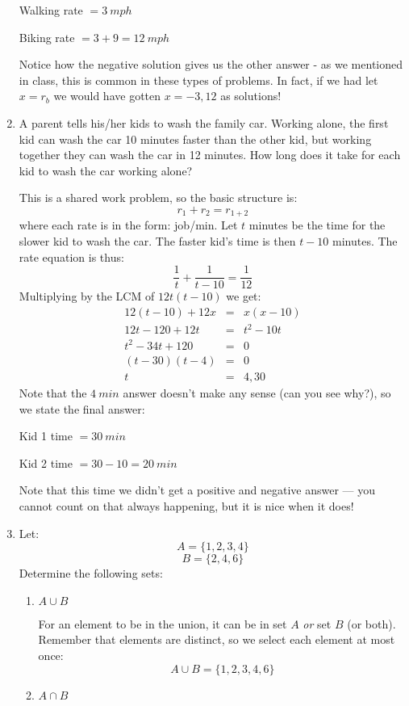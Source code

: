 \documentclass[letterpaper,12pt,fleqn]{article}
\begin{document}
\begin{enumerate}
  Walking rate $=\SI{3}{mph}$

  Biking rate $=3+9=\SI{12}{mph}$

  Notice how the negative solution gives us the other answer - as we mentioned
  in class, this is common in these types of problems. In fact, if we had let
  $x=r_b$ we would have gotten $x=-3,12$ as solutions!

\item A parent tells his/her kids to wash the family car. Working alone, the
  first kid can wash the car 10 minutes faster than the other kid, but working
  together they can wash the car in 12 minutes. How long does it take for each
  kid to wash the car working alone?

  This is a shared work problem, so the basic structure is:
  \[r_1+r_2=r_{1+2}\]
  where each rate is in the form: job/min. Let $t$ minutes be the time for the
  slower kid to wash the car. The faster kid's time is then $t-10$ minutes. The
  rate equation is thus:
  \[\frac{1}{t}+\frac{1}{t-10}=\frac{1}{12}\]
  Multiplying by the LCM of $12t(t-10)$ we get:
  \begin{eqnarray*}
    12(t-10)+12x &=& x(x-10) \\
    12t-120+12t &=& t^2-10t \\
    t^2-34t+120 &=& 0 \\
    (t-30)(t-4) &=& 0 \\
    t &=& 4,30
  \end{eqnarray*}
  Note that the $\SI{4}{min}$ answer doesn't make any sense (can you see why?),
  so we state the final answer:

  Kid 1 time $=\SI{30}{min}$

  Kid 2 time $=30-10=\SI{20}{min}$

  Note that this time we didn't get a positive and negative answer --- you
  cannot count on that always happening, but it is nice when it does!

\item Let:
  \[A=\{1,2,3,4\}\]
  \[B=\{2,4,6\}\]
  Determine the following sets:
  \begin{enumerate}
  \item $A\cup B$

    For an element to be in the union, it can be in set $A$ \emph{or} set $B$
    (or both). Remember that elements are distinct, so we select each element
    at most once:
    \[A\cup B=\{1,2,3,4,6\}\]
      
  \item $A\cap B$


\end{enumerate}
\end{enumerate}
\end{document}
